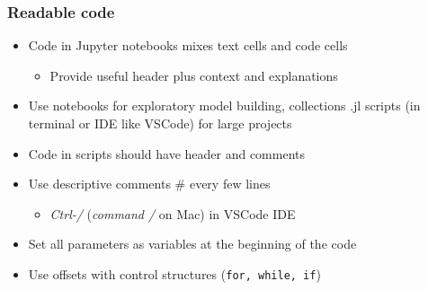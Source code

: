 \documentclass[bigger]{beamer}
\begin{document}
\begin{frame}

\frametitle{Readable code}

\begin{itemize}

\item Code in Jupyter notebooks mixes text cells and code cells
\begin{itemize}
\item Provide useful header plus context and explanations
\end{itemize}

\item Use notebooks for exploratory model building, collections .jl scripts (in terminal or IDE like VSCode) for large projects 

\item Code in scripts should have header and comments 

\item Use descriptive comments $\#$ every few lines

\begin{itemize}
\item \emph{Ctrl-/} (\emph{command /} on Mac) in VSCode IDE
\end{itemize}

\item Set all parameters as variables at the beginning of the code

\item Use offsets with control structures (\texttt{for, while, if})

\end{itemize}

\end{frame}%
\end{document}
